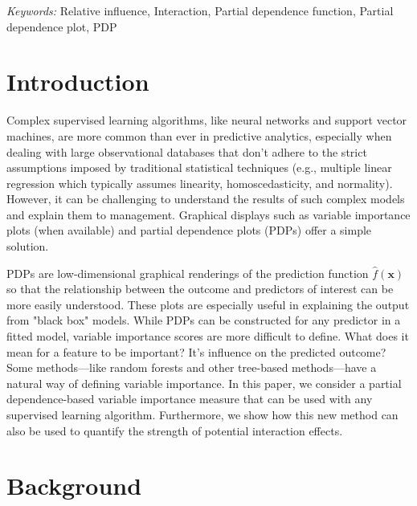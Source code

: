 \documentclass[12pt]{article}
\begin{document}
\noindent%
{\it Keywords:} Relative influence, Interaction, Partial dependence function, Partial dependence plot, PDP
\vfill

\newpage
{} %


\section{Introduction}
\label{sec:introduction}

Complex supervised learning algorithms, like neural networks and support vector machines, are more common than ever in predictive analytics, especially when dealing with large observational databases that don't adhere to the strict assumptions imposed by traditional statistical techniques (e.g., multiple linear regression which typically assumes linearity, homoscedasticity, and normality). However, it can be challenging to understand the results of such complex models and explain them to management. Graphical displays such as variable importance plots (when available) and partial dependence plots (PDPs) offer a simple solution. 

PDPs are low-dimensional graphical renderings of the prediction function $\widehat{f}\left(\boldsymbol{x}\right)$ so that the relationship between the outcome and predictors of interest can be more easily understood. These plots are especially useful in explaining the output from "black box" models. While PDPs can be constructed for any predictor in a fitted model, variable importance scores are more difficult to define. What does it mean for a feature to be important? It's influence on the predicted outcome? Some methods---like random forests and other tree-based methods---have a natural way of defining variable importance. In this paper, we consider a partial dependence-based variable importance measure that can be used with any supervised learning algorithm. Furthermore, we show how this new method can also be used to quantify the strength of potential interaction effects.


\section{Background}
\label{sec:background}
\end{document}
